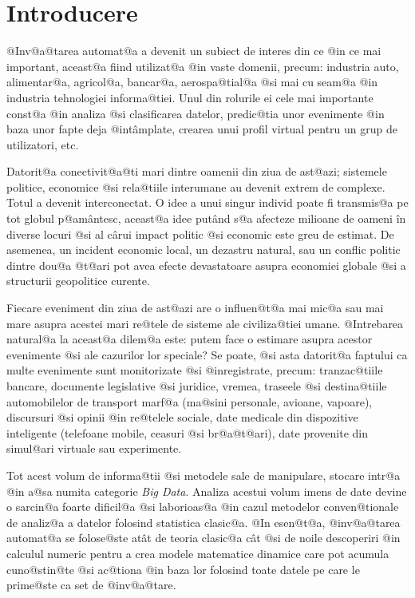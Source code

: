 

\chapter*{Introducere}
\label{capintro}

@Inv@a@tarea automat@a a devenit un subiect de interes din ce @in ce mai important, aceast@a fiind utilizat@a @in vaste domenii, precum: industria auto, alimentar@a, agricol@a, bancar@a, aerospa@tial@a @si mai cu seam@a @in industria tehnologiei informa@tiei. Unul din rolurile ei cele mai importante const@a @in analiza @si clasificarea datelor, predic@tia unor evenimente @in baza unor fapte deja @int\^ amplate, crearea unui profil virtual pentru un grup de utilizatori, etc.

Datorit@a conectivit@a@ti mari dintre oamenii din ziua de ast@azi; sistemele politice, economice @si rela@tiile interumane au devenit extrem de complexe. Totul a devenit interconectat. O idee a unui singur individ poate fi transmis@a pe tot globul p@am\^ antesc, aceast@a idee put\^ and s@a afecteze milioane de oameni \^ in diverse locuri @si al c\^ arui impact politic @si economic este greu de estimat. De asemenea, un incident economic local, un dezastru natural, sau un conflic politic dintre dou@a @t@ari pot avea efecte devastatoare asupra economiei globale @si a structurii geopolitice curente.

Fiecare eveniment din ziua de ast@azi are o influen@t@a mai mic@a sau mai mare asupra acestei mari re@tele de sisteme ale civiliza@tiei umane. @Intrebarea natural@a la aceast@a dilem@a este: putem face o estimare asupra acestor evenimente @si ale cazurilor lor speciale? Se poate, @si asta datorit@a faptului ca multe evenimente sunt monitorizate @si @inregistrate, precum: tranzac@tiile bancare, documente legislative @si juridice, vremea, traseele @si destina@tiile automobilelor de transport marf@a (ma@sini personale, avioane, vapoare), discursuri @si opinii @in re@telele sociale, date medicale din dispozitive inteligente (telefoane mobile, ceasuri @si br@a@t@ari), date provenite din simul@ari virtuale sau experimente. 

Tot acest volum de informa@tii @si metodele sale de manipulare, stocare intr@a @in a@sa numita categorie {\sl Big Data}. Analiza acestui volum imens de date devine o sarcin@a foarte dificil@a @si laborioas@a @in cazul metodelor conven@tionale de analiz@a a datelor folosind statistica clasic@a. @In esen@t@a, @inv@a@tarea automat@a se folose@ste at\^ at de teoria clasic@a c\^  at @si de noile descoperiri @in calculul numeric pentru a crea modele matematice dinamice care pot acumula cuno@stin@te @si ac@tiona @in baza lor folosind toate datele pe care le prime@ste ca set de @inv@a@tare.

